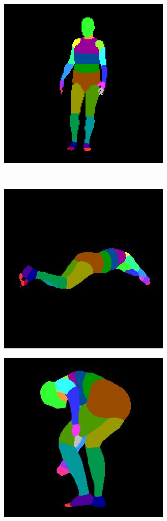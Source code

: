 \begin{figure}
\begin{subfigure}{.19\textwidth}
\end{subfigure}
\begin{subfigure}{.19\textwidth}
  \centering
  \includegraphics[scale=0.3]{ung_144_34_c0008_segm_39_gt.png}
\end{subfigure}\\
\begin{subfigure}{.2\textwidth}
\centering
  \includegraphics[scale=0.3]{ung_126_09_c0008_85.jpg}
\end{subfigure}%
\begin{subfigure}{.19\textwidth}
  \centering
  \includegraphics[scale=0.3]{ung_137_31_c0008_77.jpg}

\end{subfigure}
\end{figure}
